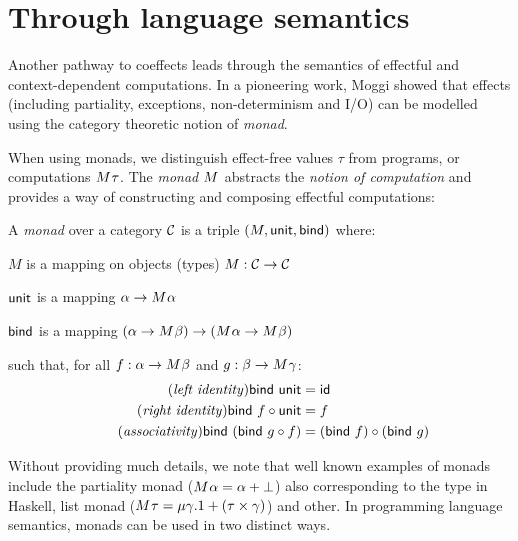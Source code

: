 
\section{Through language semantics}
\label{sec:path-sem}

Another pathway to coeffects leads through the semantics of effectful and context-dependent 
computations. In a pioneering work, Moggi \cite{monad-notions} showed that effects (including
partiality, exceptions, non-determinism and I/O) can be modelled using the category theoretic
notion of \emph{monad}.

When using monads, we distinguish effect-free values $\tau$ from programs, or 
computations $M^{}\tau$. The \emph{monad} $M^{}$ abstracts the \emph{notion of 
computation} and provides a way of constructing and composing effectful computations:

\begin{definition}
A \emph{monad} over a category $\mathcal{C}$ is a triple $(M, \textnormal{\sffamily unit}, \textnormal{\sffamily bind})$ where:
\begin{compactitem}
\item $M$ is a mapping on objects (types) $M : \mathcal{C} \rightarrow \mathcal{C}$
\item $\textnormal{\sffamily unit}$ is a mapping $\alpha \rightarrow M^{}\alpha$ 
\item $\textnormal{\sffamily bind}$ is a mapping $(\alpha \rightarrow M^{}\beta) 
  \rightarrow (M^{}\alpha \rightarrow M^{}\beta)$
\end{compactitem}
such that, for all $f:\alpha \rightarrow M^{}\beta$ and $g:\beta \rightarrow M^{}\gamma$:
\begin{align}
\tag{\emph{left identity}}
  \ident{bind}~\ident{unit} &= \idf{}
  \\
\tag{\emph{right identity}}
  \ident{bind}~f \circ \ident{unit} &= f
  \\
\tag{\emph{associativity}}
  \ident{bind}~(\ident{bind}~g \circ f) &= (\ident{bind}~f) \circ (\ident{bind}~g)
\end{align}
\end{definition}

\noindent
Without providing much details, we note that well known examples of monads include the partiality
monad ($M^{}\alpha = \alpha + {\bot}$) also corresponding to the  type in 
Haskell, list monad ($M^{}\tau = \mu \gamma.1 + (\tau \times \gamma)$) and other.
In programming language semantics, monads can be used in two distinct ways.

